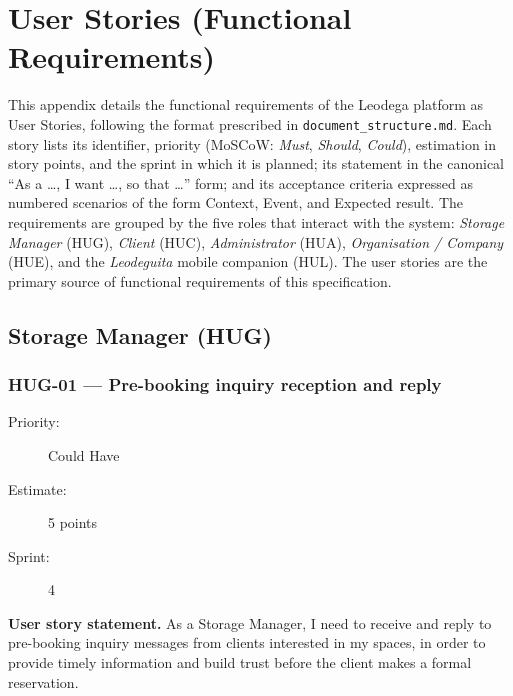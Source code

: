 \documentclass[11pt,a4paper,oneside]{report}
\begin{document}
\chapter{User Stories (Functional Requirements)}
\label{app:user-stories}

This appendix details the functional requirements of the Leodega platform as User Stories, following the format prescribed in \texttt{document\_structure.md}. Each story lists its identifier, priority (MoSCoW: \emph{Must}, \emph{Should}, \emph{Could}), estimation in story points, and the sprint in which it is planned; its statement in the canonical ``As a \dots, I want \dots, so that \dots'' form; and its acceptance criteria expressed as numbered scenarios of the form Context, Event, and Expected result. The requirements are grouped by the five roles that interact with the system: \emph{Storage Manager} (HUG), \emph{Client} (HUC), \emph{Administrator} (HUA), \emph{Organisation / Company} (HUE), and the \emph{Leodeguita} mobile companion (HUL). The user stories are the primary source of functional requirements of this specification.

\section{Storage Manager (HUG)}

\subsection{HUG-01 --- Pre-booking inquiry reception and reply}
\label{req:HUG-01}
\begin{description}
\item[Priority:] Could Have \quad \item[Estimate:] 5 points \quad \item[Sprint:] 4
\end{description}

\textbf{User story statement.} As a Storage Manager, I need to receive and reply to pre-booking inquiry messages from clients interested in my spaces, in order to provide timely information and build trust before the client makes a formal reservation.
\end{document}
